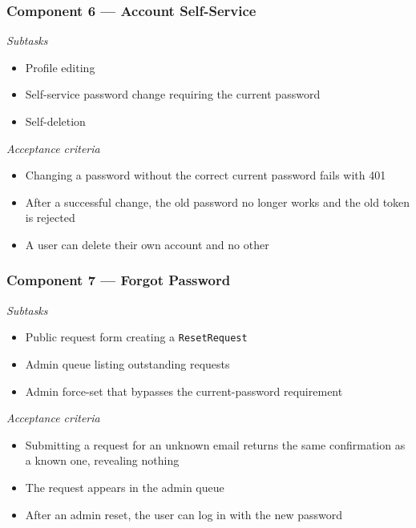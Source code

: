 \documentclass[11pt,letterpaper]{article}
\begin{document}
\subsubsection*{Component 6 --- Account Self-Service}
\textit{Subtasks}
\begin{itemize}
  \item Profile editing
  \item Self-service password change requiring the current password
  \item Self-deletion
\end{itemize}
\textit{Acceptance criteria}
\begin{itemize}
  \item Changing a password without the correct current password fails with 401
  \item After a successful change, the old password no longer works and the
        old token is rejected
  \item A user can delete their own account and no other
\end{itemize}

\subsubsection*{Component 7 --- Forgot Password}
\textit{Subtasks}
\begin{itemize}
  \item Public request form creating a \texttt{ResetRequest}
  \item Admin queue listing outstanding requests
  \item Admin force-set that bypasses the current-password requirement
\end{itemize}
\textit{Acceptance criteria}
\begin{itemize}
  \item Submitting a request for an unknown email returns the same confirmation
        as a known one, revealing nothing
  \item The request appears in the admin queue
  \item After an admin reset, the user can log in with the new password
\end{itemize}
\end{document}
